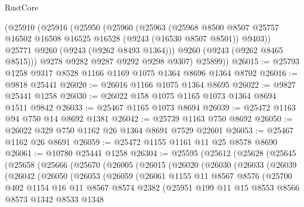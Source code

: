 \begin{lexlean}{RustCore}
\begin{coremodule}
      (@25910
        (@25916
          (@25950
            (@25960
              (@25963
                (@25968
                  @8500
                  @8507
                  @25757
                  @16502
                  @16508
                  @16525
                  @16528
                  (@9243 (@16530 @8507 @8501))
                  @9403))
              @25771
              @9260
              (@9243 (@9262 @8493 @1364)))
            @9260
            (@9243 (@9262 @8465 @8515)))
          @9278
          @9282
          @9287
          @9292
          @9298
          @9307)
        @25899))
@26015 := @25793 @1258 @9317 @8528 @1166 @1169 @1075 @1364 @8696 @1364 @8702
@26016 := @9818 @25441
@26020 := @26016 @1166 @1075 @1364 @8695
@26022 := @9827 @25441 @1258
@26030 := @26022 @158 @1075 @1165 @1073 @1364 @8694 @1511 @9842
@26033 := @25467 @1165 @1073 @8694
@26039 := @25472 @1163 @94 @750 @14 @8692 @1381
@26042 := @25739 @1163 @750 @8692
@26050 := @26022 @329 @750 @1162 @26 @1364 @8691 @7529 @22601
@26053 := @25467 @1162 @26 @8691
@26059 := @25472 @1155 @1161 @11 @25 @8578 @8690
@26061 := @10780 @25441 @1258
@26304 := @25595
    (@25612
      (@25628
        (@25645
          (@25658
            (@25666
              (@25670
                (@26005
                  (@26015
                    (@26020
                      (@26030
                        (@26033
                          (@26039
                            (@26042
                              (@26050
                                (@26053
                                  (@26059
                                    (@26061
                                      @1155
                                      @11
                                      @8567
                                      @8576
                                      (@25700
                                        @402
                                        @1154
                                        @16
                                        @11
                                        @8567
                                        @8574
                                        @2382
                                        (@25951
                                          @199
                                          @11
                                          @15
                                          @8553
                                          @8566
                                          @8573
                                          @1342
                                          @8533
                                          @1348

\end{coremodule}
\end{lexlean}
